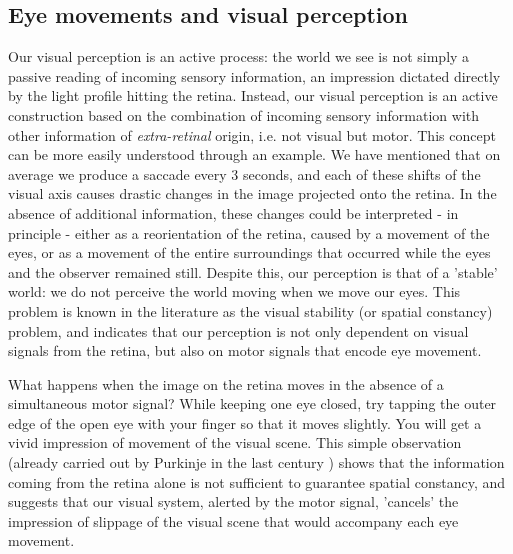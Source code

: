 \documentclass[11pt]{article}
\begin{document}
\subsection{Eye movements and visual perception}
Our visual perception is an active process: the world we see is not simply a passive reading of incoming sensory information, an impression dictated directly by the light profile hitting the retina. Instead, our visual perception is an active construction based on the combination of incoming sensory information with other information of \textit{extra-retinal} origin, i.e. not visual but motor. This concept can be more easily understood through an example. We have mentioned that on average we produce a saccade every 3 seconds, and each of these shifts of the visual axis causes drastic changes in the image projected onto the retina. In the absence of additional information, these changes could be interpreted - in principle - either as a reorientation of the retina, caused by a movement of the eyes, or as a movement of the entire surroundings that occurred while the eyes and the observer remained still. Despite this, our perception is that of a 'stable' world: we do not perceive the world moving when we move our eyes. This problem is known in the literature as the visual stability (or spatial constancy) problem, and indicates that our perception is not only dependent on visual signals from the retina, but also on motor signals that encode eye movement.

What happens when the image on the retina moves in the absence of a simultaneous motor signal? While keeping one eye closed, try tapping the outer edge of the open eye with your finger so that it moves slightly. You will get a vivid impression of movement of the visual scene. This simple observation (already carried out by Purkinje in the last century \cite{Purkinje1825}) shows that the information coming from the retina alone is not sufficient to guarantee spatial constancy, and suggests that our visual system, alerted by the motor signal, 'cancels' the impression of slippage of the visual scene that would accompany each eye movement.
\end{document}
